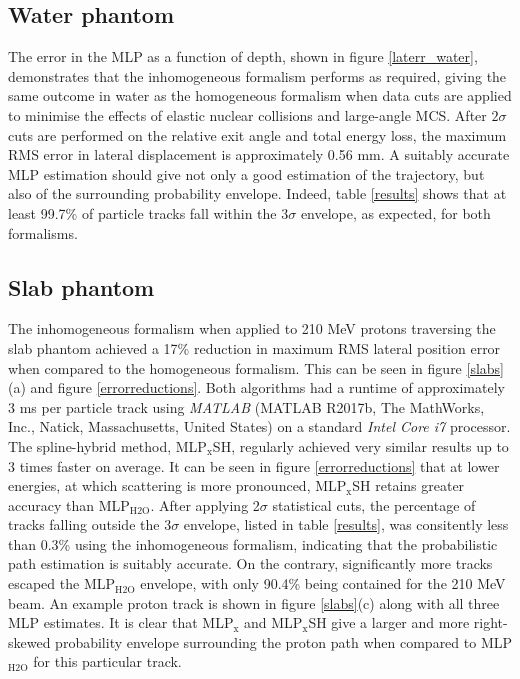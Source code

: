 \documentclass[preprint,times]{elsarticle}
\newcommand{\Fig}[1]{figure #1} %
\newcommand{\Tab}[1]{table #1} %
\begin{document}
\subsection{Water phantom}

The error in the MLP as a function of depth, shown in \Fig{\ref{laterr_water}}, demonstrates that the inhomogeneous formalism performs as required, giving the same outcome in water as the homogeneous formalism when data cuts are applied to minimise the effects of elastic nuclear collisions and large-angle MCS. After $2\sigma$ cuts are performed on the relative exit angle and total energy loss, the maximum RMS error in lateral displacement is approximately 0.56 mm. A suitably accurate MLP estimation should give not only a good estimation of the trajectory, but also of the surrounding probability envelope. Indeed, \Tab{\ref{results}} shows that at least 99.7\% of particle tracks fall within the 3$\sigma$ envelope, as expected, for both formalisms.

\subsection{Slab phantom}

The inhomogeneous formalism when applied to 210 MeV protons traversing the slab phantom achieved a 17\% reduction in maximum RMS lateral position error when compared to the homogeneous formalism. This can be seen in \Fig{\ref{slabs}}(a) and \Fig{\ref{errorreductions}}. Both algorithms had a runtime of approximately 3 ms per particle track using \emph{MATLAB} (MATLAB R2017b, The MathWorks, Inc., Natick, Massachusetts, United States) on a standard \emph{Intel Core i7} processor. The spline-hybrid method, MLP$_\mathrm{x}$SH, regularly achieved very similar results up to 3 times faster on average. It can be seen in \Fig{\ref{errorreductions}} that at lower energies, at which scattering is more pronounced, MLP$_\mathrm{x}$SH retains greater accuracy than MLP$_\mathrm{H2O}$. After applying 2$\sigma$ statistical cuts, the percentage of tracks falling outside the 3$\sigma$ envelope, listed in \Tab{\ref{results}}, was consitently less than 0.3\% using the inhomogeneous formalism, indicating that the probabilistic path estimation is suitably accurate. On the contrary, significantly more tracks escaped the MLP$_\mathrm{H2O}$ envelope, with only 90.4\% being contained for the 210 MeV beam. An example proton track is shown in \Fig{\ref{slabs}}(c) along with all three MLP estimates. It is clear that MLP$_\mathrm{x}$ and MLP$_\mathrm{x}$SH give a larger and more right-skewed probability envelope surrounding the proton path when compared to MLP$_\mathrm{H2O}$ for this particular track.
\end{document}
